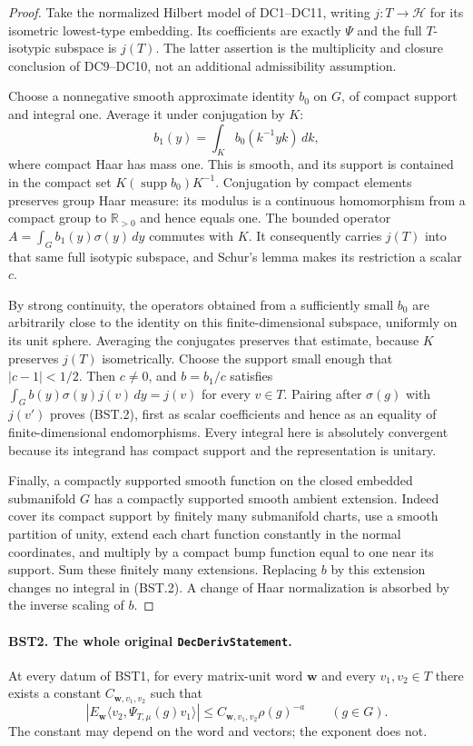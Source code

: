 \begin{proof}
Take the normalized Hilbert model of DC1--DC11, writing $j:T\to
\mathcal H$ for its isometric lowest-type embedding.  Its coefficients
are exactly $\Psi$ and the full $T$-isotypic subspace is $j(T)$.
The latter assertion is the multiplicity and closure conclusion of
DC9--DC10, not an additional admissibility assumption.

Choose a nonnegative smooth approximate identity $b_0$ on $G$, of
compact support and integral one.  Average it under conjugation by
$K$:
\[
 b_1(y)=\int_K b_0(k^{-1}yk)\,dk ,
 \tag{BST.3}
\]
where compact Haar has mass one.  This is smooth, and its support is
contained in the compact set $K(\operatorname{supp}b_0)K^{-1}$.
Conjugation by compact elements preserves group Haar measure: its
modulus is a continuous homomorphism from a compact group to
$\mathbb R_{>0}$ and hence equals one.
The bounded operator $A=\int_G b_1(y)\sigma(y)\,dy$ commutes with
$K$.  It consequently carries $j(T)$ into that same full isotypic
subspace, and Schur's lemma makes its restriction a scalar $c$.

By strong continuity, the operators obtained from a sufficiently small
$b_0$ are arbitrarily close to the identity on this finite-dimensional
subspace, uniformly on its unit sphere.  Averaging the conjugates
preserves that estimate, because $K$ preserves $j(T)$ isometrically.
Choose the support small enough that $|c-1|<1/2$.  Then $c\ne0$,
and $b=b_1/c$ satisfies
$\int_G b(y)\sigma(y)j(v)\,dy=j(v)$ for every $v\in T$.
Pairing after $\sigma(g)$ with $j(v')$ proves (BST.2), first as
scalar coefficients and hence as an equality of finite-dimensional
endomorphisms.  Every integral here is absolutely convergent because
its integrand has compact support and the representation is unitary.

Finally, a compactly supported smooth function on the closed embedded
submanifold $G$ has a compactly supported smooth ambient extension.
Indeed cover its compact support by finitely many submanifold charts,
use a smooth partition of unity, extend each chart function constantly
in the normal coordinates, and multiply by a compact bump function
equal to one near its support.  Sum these finitely many extensions.
Replacing $b$ by this extension changes no integral in (BST.2).
A change of Haar normalization is absorbed by the inverse scaling
of $b$.
\end{proof}

\paragraph{BST2. The whole original \texttt{DecDerivStatement}.}
\label{claim:BST2}
At every datum of BST1, for every matrix-unit word $\mathbf w$
and every $v_1,v_2\in T$ there exists a constant $C_{\mathbf w,v_1,v_2}$
such that
\[
 \left|E_{\mathbf w}
       \langle v_2,\Psi_{T,\mu}(g)v_1\rangle\right|
       \le C_{\mathbf w,v_1,v_2}\rho(g)^{-a}
       \qquad(g\in G).
 \tag{BST.4}
\]
The constant may depend on the word and vectors; the exponent does not.

